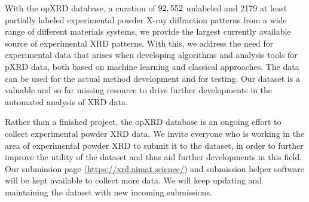 With the opXRD database, a curation of $92,552$ unlabeled and 2179 at least partially labeled experimental powder X-ray diffraction patterns from a wide range of different materials systems, we provide the largest currently available source of experimental XRD patterns. With this, we address the need for experimental data that arises when developing algorithms and analysis tools for pXRD data, both based on machine learning and classical approaches. The data can be used for the actual method development and for testing. Our dataset is a valuable and so far missing resource to drive further developments in the automated analysis of XRD data.

Rather than a finished project, the opXRD database is an ongoing effort to collect experimental powder XRD data. We invite everyone who is working in the area of experimental powder XRD to submit it to the dataset, in order to further improve the utility of the dataset and thus aid further developments in this field. Our submission page (\url{https://xrd.aimat.science/}) and submission helper software will be kept available to collect more data. We will keep updating and maintaining the dataset with new incoming submissions.
